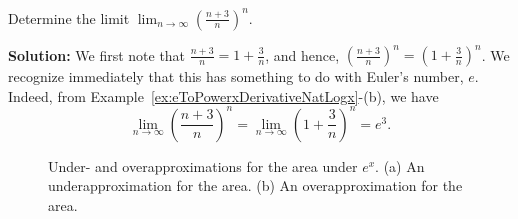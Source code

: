 \bigskip

\begin{example} Determine the limit $\displaystyle \lim_{n \to \infty} \left( \frac{n+3}{n} \right)^n$.


\end{example}

\textbf{Solution:} We first note that $ \frac{n+3}{n} = 1 + \frac{3}{n}$, and hence, $ \left ( \frac{n+3}{n} \right)^n =  \left ( 1 + \frac{3}{n} \right)^n$. We recognize immediately that this has something to do with Euler's number, $e$. Indeed, from Example~\ref{ex:eToPowerxDerivativeNatLogx}-(b), we have
$$ \lim_{n \to \infty} \left( \frac{n+3}{n} \right)^n = \lim_{n \to \infty} \left ( 1 + \frac{3}{n} \right)^n = e^3.$$
\Qed

\bigskip



\begin{figure}[htb]%
\centering
{}%
\hspace{5pt}%
%
    \caption[]{Under- and overapproximations for the area under $e^x$. (a) An underapproximation for the area. (b) An overapproximation for the area.}
    \label{fig:ApproxAreaExponential}
\end{figure}


